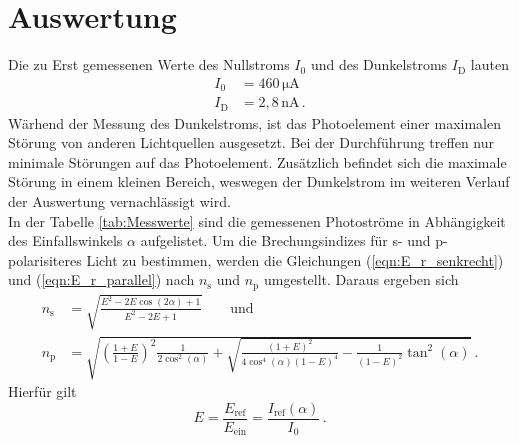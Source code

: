 


\nocite{anleitungV407}
\section{Auswertung}
\label{sec:Auswertung}
Die zu Erst gemessenen Werte des Nullstroms $I_0$ und des Dunkelstroms $I_{\text{D}}$ lauten
\begin{align*}
  I_0 &= 460\,\unit{\micro\ampere}\\
  I_{\text{D}} &= 2,8\,\unit{\nano\ampere}\,.
\end{align*}
Wärhend der Messung des Dunkelstroms, ist das Photoelement einer maximalen Störung von anderen Lichtquellen ausgesetzt. Bei der Durchführung treffen nur minimale Störungen auf
das Photoelement. Zusätzlich befindet sich die maximale Störung in einem kleinen Bereich, weswegen der Dunkelstrom im weiteren Verlauf der Auswertung vernachlässigt wird.
\\In der Tabelle \ref{tab:Messwerte} sind die gemessenen Photoströme in Abhängigkeit des Einfallswinkels $\alpha$ aufgelistet.
Um die Brechungsindizes für s- und p-polarisiteres Licht zu bestimmen, werden die Gleichungen (\ref{eqn:E_r_senkrecht}) und (\ref{eqn:E_r_parallel}) nach $n_{\text{s}}$ und $n_{\text{p}}$
umgestellt. Daraus ergeben sich
\begin{align}
  n_{\text{s}} &= \sqrt{\frac{E^2 - 2E\cos(2\alpha) + 1}{E^2- 2E + 1}} \label{eqn:n_s} \qquad {\text{und}}\\
  n_{\text{p}} &= \sqrt{\left(\frac{1+E}{1-E}\right)^2 \frac{1}{2\cos^2(\alpha)} + \sqrt{\frac{(1+E)^2}{4\cos^4(\alpha)(1-E)^4}- \frac{1}{(1-E)^2} \tan^2(\alpha)}} \label{eqn:n_p}\,.
\end{align}
Hierfür gilt $$E = \frac{E_{\text{ref}}}{E_{\text{ein}}} = \frac{I_{\text{ref}}(\alpha)}{I_0}\,.$$
